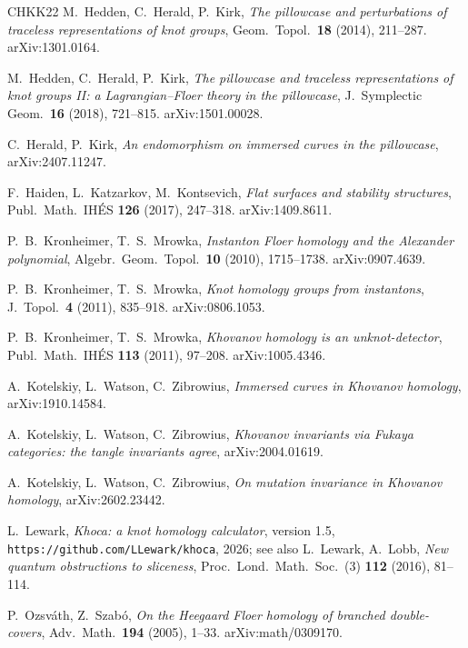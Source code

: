 \documentclass[11pt,reqno]{amsart}
\theoremstyle{plain}
\theoremstyle{definition}
\numberwithin{equation}{section}
\begin{document}
\begin{thebibliography}{CHKK22}
 M.~Hedden, C.~Herald, P.~Kirk, \emph{The pillowcase and perturbations of traceless
representations of knot groups}, Geom.\ Topol.\ \textbf{18} (2014), 211--287. arXiv:1301.0164.

 M.~Hedden, C.~Herald, P.~Kirk, \emph{The pillowcase and traceless representations of
knot groups II: a Lagrangian--Floer theory in the pillowcase}, J.\ Symplectic Geom.\ \textbf{16}
(2018), 721--815. arXiv:1501.00028.

 C.~Herald, P.~Kirk, \emph{An endomorphism on immersed curves in the pillowcase},
arXiv:2407.11247.

 F.~Haiden, L.~Katzarkov, M.~Kontsevich, \emph{Flat surfaces and stability
structures}, Publ.\ Math.\ IH\'ES \textbf{126} (2017), 247--318. arXiv:1409.8611.

 P.~B.~Kronheimer, T.~S.~Mrowka, \emph{Instanton Floer homology and the
Alexander polynomial}, Algebr.\ Geom.\ Topol.\ \textbf{10} (2010), 1715--1738. arXiv:0907.4639.

 P.~B.~Kronheimer, T.~S.~Mrowka, \emph{Knot homology groups from instantons}, J.\ Topol.\
\textbf{4} (2011), 835--918. arXiv:0806.1053.

 P.~B.~Kronheimer, T.~S.~Mrowka, \emph{Khovanov homology is an unknot-detector}, Publ.\ Math.\
IH\'ES \textbf{113} (2011), 97--208. arXiv:1005.4346.

 A.~Kotelskiy, L.~Watson, C.~Zibrowius, \emph{Immersed curves in Khovanov
homology}, arXiv:1910.14584.

 A.~Kotelskiy, L.~Watson, C.~Zibrowius, \emph{Khovanov invariants via Fukaya
categories: the tangle invariants agree}, arXiv:2004.01619.

 A.~Kotelskiy, L.~Watson, C.~Zibrowius, \emph{On mutation invariance in Khovanov
homology}, arXiv:2602.23442.

 L.~Lewark, \emph{Khoca: a knot homology calculator}, version 1.5,
\texttt{https://github.com/LLewark/khoca}, 2026; see also L.~Lewark, A.~Lobb, \emph{New quantum
obstructions to sliceness}, Proc.\ Lond.\ Math.\ Soc.\ (3) \textbf{112} (2016), 81--114.

\bibitem[OS05]{OSbranched} P.~Ozsv\'ath, Z.~Szab\'o, \emph{On the Heegaard Floer homology of branched double-covers},
Adv.\ Math.\ \textbf{194} (2005), 1--33. arXiv:math/0309170.


\end{thebibliography}
\end{document}

